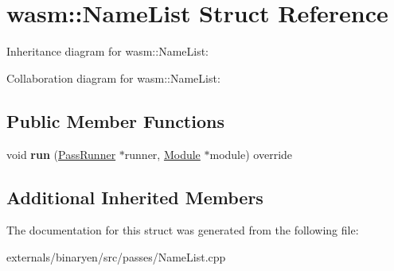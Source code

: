 \hypertarget{structwasm_1_1_name_list}{}\section{wasm\+:\+:Name\+List Struct Reference}
\label{structwasm_1_1_name_list}


Inheritance diagram for wasm\+:\+:Name\+List\+:


Collaboration diagram for wasm\+:\+:Name\+List\+:
\subsection*{Public Member Functions}
\begin{DoxyCompactItemize}
\item 
\mbox{\label{structwasm_1_1_name_list_acef34ff16ee03569ad1486cc05d27825}} 
void {\bfseries run} (\mbox{\hyperlink{structwasm_1_1_pass_runner}{Pass\+Runner}} $\ast$runner, \mbox{\hyperlink{classwasm_1_1_module}{Module}} $\ast$module) override
\end{DoxyCompactItemize}
\subsection*{Additional Inherited Members}


The documentation for this struct was generated from the following file\+:\begin{DoxyCompactItemize}
\item 
externals/binaryen/src/passes/Name\+List.\+cpp\end{DoxyCompactItemize}
